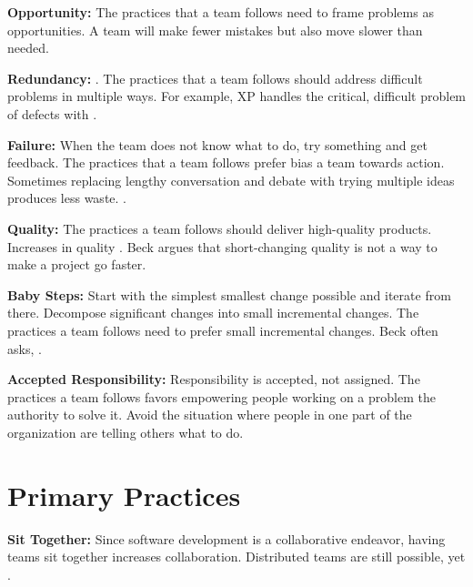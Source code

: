 \textbf{Opportunity:} The practices that a team follows need to frame problems as opportunities. A team  will make fewer mistakes but also move slower than needed.


\textbf{Redundancy:}  \cite{BeckExtremeProgramming2004}. The practices that a team follows should address difficult problems in multiple ways. For example, XP handles the critical, difficult problem of defects with   \cite{BeckExtremeProgramming2004}. 




\textbf{Failure:} When the team does not know what to do, try something and get feedback. The practices that a team follows prefer bias a team towards action. Sometimes replacing lengthy conversation and debate with trying multiple ideas produces less waste.  \cite{BeckExtremeProgramming2004}.


\textbf{Quality:} The practices a team follows should deliver high-quality products. Increases in quality  \cite{BeckExtremeProgramming2004}. Beck argues that short-changing quality is not a way to make a project go faster. 


\textbf{Baby Steps:} Start with the simplest smallest change possible and iterate from there. Decompose significant changes into small incremental changes. The practices a team follows need to prefer small incremental changes. Beck often asks,  \cite{BeckExtremeProgramming2004}. 


\textbf{Accepted Responsibility:} Responsibility is accepted, not assigned. The practices a team follows favors empowering people working on a problem the authority to solve it. Avoid the situation where people in one part of the organization are telling others what to do. 


\section{Primary Practices}
\textbf{Sit Together:} Since software development is a collaborative endeavor, having teams sit together increases collaboration. Distributed teams are still possible, yet   \cite{BeckExtremeProgramming2004}. 


